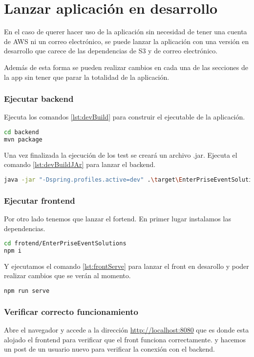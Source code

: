 \section{Lanzar aplicación en desarrollo}
En el caso de querer hacer uso de la aplicación sin necesidad de tener una cuenta de AWS ni un correo electrónico, se puede lanzar la aplicación con una versión en desarrollo que
carece de las dependencias de S3 y de correo electrónico. 

Además de esta forma se pueden realizar cambios en cada una de las secciones de la app sin tener que parar la totalidad de la aplicación. 

\subsubsection{Ejecutar backend}
Ejecuta los comandos \ref{lst:devBuild} para construir el ejecutable de la aplicación.
\begin{lstlisting}[language=Bash, caption=Construir ejecutable, label=lst:devBuild]
cd backend
mvn package
\end{lstlisting}

Una vez finalizada la ejecución de los test se creará un archivo .jar. Ejecuta el comando \ref{lst:devBuildJAr} para lanzar el backend.
\begin{lstlisting}[language=Bash, caption=Lanzar ejecutable, label=lst:devBuildJAr]
java -jar "-Dspring.profiles.active=dev" .\target\EnterPriseEventSolutions-0.0.1-SNAPSHOT.jar
\end{lstlisting}

\subsubsection{Ejecutar frontend}
Por otro lado tenemos que lanzar el fortend. En primer lugar instalamos las dependencias.
\begin{lstlisting}[language=Bash, caption=Instalar dependencias del frontend, label=lst:frontBuild]
cd frotend/EnterPriseEventSolutions
npm i
\end{lstlisting}

Y ejecutamos el comando \ref{lst:frontServe} para lanzar el front en desarollo y poder realizar cambios que se verán al momento.
\begin{lstlisting}[language=Bash, caption=Lanzar frontend, label=lst:frontServe]
npm run serve
\end{lstlisting}

\subsubsection{Verificar correcto funcionamiento}
Abre el navegador y accede a la dirección \href{http://localhost:8080}{http://localhost:8080} que es donde esta alojado el frontend para verificar que el front funciona correctamente.
y hacemos un post de un usuario nuevo para verificar la conexión con el backend.


